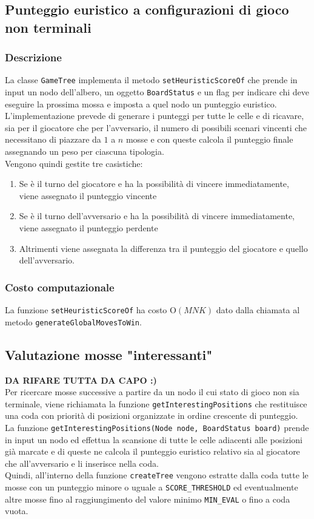 \documentclass[11pt]{article}
\begin{document}
\subsection*{Punteggio euristico a configurazioni di gioco non terminali}
\subsubsection*{Descrizione}
La classe \texttt{GameTree} implementa il metodo \texttt{setHeuristicScoreOf} che prende in input un nodo dell'albero, un oggetto \texttt{BoardStatus} e un flag per indicare chi deve eseguire la prossima mossa e imposta a quel nodo un punteggio euristico.\\
L'implementazione prevede di generare i punteggi per tutte le celle e di ricavare, sia per il giocatore che per l'avversario, il numero di possibili scenari vincenti che necessitano di piazzare da $1$ a $n$ mosse e con queste calcola il punteggio finale assegnando un peso per ciascuna tipologia.\\
Vengono quindi gestite tre casistiche: 
\begin{enumerate}
\setlength\itemsep{0.05cm}
	\item Se è il turno del giocatore e ha la possibilità di vincere immediatamente, viene assegnato il punteggio vincente
	\item Se è il turno dell'avversario e ha la possibilità di vincere immediatamente, viene assegnato il punteggio perdente
	\item Altrimenti viene assegnata la differenza tra il punteggio del giocatore e quello dell'avversario.
\end{enumerate}
\subsubsection*{Costo computazionale}
La funzione \texttt{setHeuristicScoreOf} ha costo O$(MNK)$ dato dalla chiamata al metodo \texttt{generateGlobalMovesToWin}.

\subsection*{Valutazione mosse "interessanti"}
\textbf{DA RIFARE TUTTA DA CAPO :)}\\
Per ricercare mosse successive a partire da un nodo il cui stato di gioco non sia terminale, viene richiamata la funzione \texttt{getInterestingPositions} che restituisce una coda con priorità di posizioni organizzate in ordine crescente di punteggio.\\
La funzione \texttt{getInterestingPositions(Node node, BoardStatus board)} prende in input un nodo ed effettua la scansione di tutte le celle adiacenti alle posizioni già marcate e di queste ne calcola il punteggio euristico relativo sia al giocatore che all'avversario e li inserisce nella coda.\\
Quindi, all'interno della funzione \texttt{createTree} vengono estratte dalla coda tutte le mosse con un punteggio minore o uguale a \texttt{SCORE\_THRESHOLD} ed eventualmente altre mosse fino al raggiungimento del valore minimo \texttt{MIN\_EVAL} o fino a coda vuota.
\end{document}
